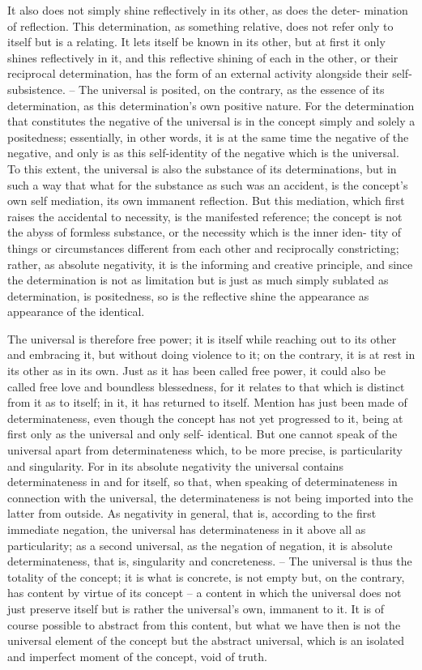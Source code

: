 It also does not simply shine reflectively in its other, as does the deter-
mination of reflection. This determination, as something relative, does not
refer only to itself but is a relating. It lets itself be known in its other, but
at first it only shines reflectively in it, and this reflective shining of each in
the other, or their reciprocal determination, has the form of an external
activity alongside their self-subsistence. – The universal is posited, on the
contrary, as the essence of its determination, as this determination’s own
positive nature. For the determination that constitutes the negative of the
universal is in the concept simply and solely a positedness; essentially, in
other words, it is at the same time the negative of the negative, and only
is as this self-identity of the negative which is the universal. To this extent,
the universal is also the substance of its determinations, but in such a way
that what for the substance as such was an accident, is the concept’s own
self mediation, its own immanent reflection. But this mediation, which first
raises the accidental to necessity, is the manifested reference; the concept is
not the abyss of formless substance, or the necessity which is the inner iden-
tity of things or circumstances different from each other and reciprocally
constricting; rather, as absolute negativity, it is the informing and creative
principle, and since the determination is not as limitation but is just as
much simply sublated as determination, is positedness, so is the reflective
shine the appearance as appearance of the identical.

The universal is therefore free power; it is itself while reaching out to its
other and embracing it, but without doing violence to it; on the contrary,
it is at rest in its other as in its own. Just as it has been called free power, it
could also be called free love and boundless blessedness, for it relates to that
which is distinct from it as to itself; in it, it has returned to itself.
Mention has just been made of determinateness, even though the concept
has not yet progressed to it, being at first only as the universal and only self-
identical. But one cannot speak of the universal apart from determinateness
which, to be more precise, is particularity and singularity. For in its absolute
negativity the universal contains determinateness in and for itself, so that,
when speaking of determinateness in connection with the universal, the
determinateness is not being imported into the latter from outside. As
negativity in general, that is, according to the first immediate negation, the
universal has determinateness in it above all as particularity; as a second
universal, as the negation of negation, it is absolute determinateness, that
is, singularity and concreteness. – The universal is thus the totality of the
concept; it is what is concrete, is not empty but, on the contrary, has content
by virtue of its concept – a content in which the universal does not just
preserve itself but is rather the universal’s own, immanent to it. It is of
course possible to abstract from this content, but what we have then is not
the universal element of the concept but the abstract universal, which is an
isolated and imperfect moment of the concept, void of truth.

